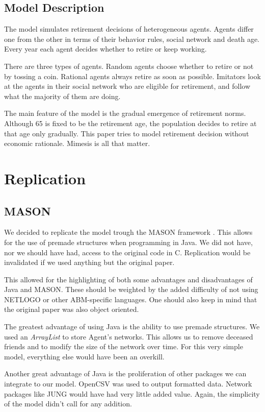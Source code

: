 \documentclass[runningheads,a4paper]{article}
\begin{document}
\subsection{Model Description}

The model simulates retirement decisions of heterogeneous agents.
Agents differ one from the other in terms of their behavior rules, social network and death age.
Every year each agent decides whether to retire or keep working. 

There are three types of agents.
Random agents choose whether to retire or not by tossing a coin.
Rational agents always retire as soon as possible.
Imitators look at the agents in their social network who are eligible for retirement, and follow what the majority of them are doing.

The main feature of the model is the gradual emergence of retirement norms.
Although 65 is fixed to be the retirement age, the population decides to retire at that age only gradually.
This paper tries to model retirement decision without economic rationale.
Mimesis is all that matter.

\section{Replication}

\subsection{MASON}
We decided to replicate the model trough the MASON framework \cite{luke2005mason}.
This allows for the use of premade structures when programming in Java.
We did not have, nor we should have had, access to the original code in C.
Replication would be invalidated if we used anything but the original paper.

This allowed for the highlighting of both some advantages and disadvantages of Java and MASON.
These should be weighted by the added difficulty of not using NETLOGO or other ABM-specific languages.
One should also keep in mind that the original paper was also object oriented.

The greatest advantage of using Java is the ability to use premade structures.
We used an \textit{ArrayList} to store Agent's networks.
This allows us to remove deceased friends and to modify the size of the network over time.
For this very simple model, everything else would have been an overkill.

Another great advantage of Java is the proliferation of other packages we can integrate to our model.
OpenCSV was used to output formatted data.
Network packages like JUNG would have had very little added value.
Again, the simplicity of the model didn't call for any addition.
\end{document}
